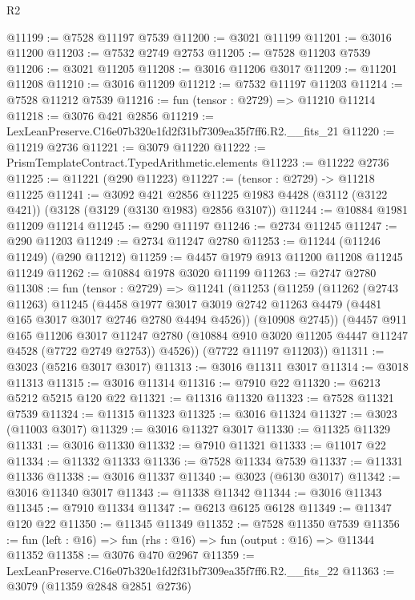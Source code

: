 \begin{lexlean}{R2}
\begin{coremodule}
@11199 := @7528 @11197 @7539
@11200 := @3021 @11199
@11201 := @3016 @11200
@11203 := @7532 @2749 @2753
@11205 := @7528 @11203 @7539
@11206 := @3021 @11205
@11208 := @3016 @11206 @3017
@11209 := @11201 @11208
@11210 := @3016 @11209
@11212 := @7532 @11197 @11203
@11214 := @7528 @11212 @7539
@11216 := fun (tensor : @2729) => @11210 @11214
@11218 := @3076 @421 @2856
@11219 := LexLeanPreserve.C16e07b320e1fd2f31bf7309ea35f7ff6.R2.__fits_21
@11220 := @11219 @2736
@11221 := @3079 @11220
@11222 := PrismTemplateContract.TypedArithmetic.elements
@11223 := @11222 @2736
@11225 := @11221 (@290 @11223)
@11227 := (tensor : @2729) -> @11218 @11225
@11241 := @3092
    @421
    @2856
    @11225
    @1983
    @4428
    (@3112 (@3122 @421))
    (@3128 (@3129 (@3130 @1983) @2856 @3107))
@11244 := @10884 @1981 @11209 @11214
@11245 := @290 @11197
@11246 := @2734 @11245
@11247 := @290 @11203
@11249 := @2734 @11247 @2780
@11253 := @11244 (@11246 @11249) (@290 @11212)
@11259 := @4457 @1979 @913 @11200 @11208 @11245 @11249
@11262 := @10884 @1978 @3020 @11199
@11263 := @2747 @2780
@11308 := fun (tensor : @2729) =>
  @11241
    (@11253
      (@11259
        (@11262
          (@2743 @11263)
          @11245
          (@4458
            @1977
            @3017
            @3019
            @2742
            @11263
            @4479
            (@4481 @165 @3017 @3017 @2746 @2780 @4494 @4526))
          (@10908 @2745))
        (@4457
          @911
          @165
          @11206
          @3017
          @11247
          @2780
          (@10884 @910 @3020 @11205 @4447 @11247 @4528 (@7722 @2749 @2753))
          @4526))
      (@7722 @11197 @11203))
@11311 := @3023 (@5216 @3017 @3017)
@11313 := @3016 @11311 @3017
@11314 := @3018 @11313
@11315 := @3016 @11314
@11316 := @7910 @22
@11320 := @6213 @5212 @5215 @120 @22
@11321 := @11316 @11320
@11323 := @7528 @11321 @7539
@11324 := @11315 @11323
@11325 := @3016 @11324
@11327 := @3023 (@11003 @3017)
@11329 := @3016 @11327 @3017
@11330 := @11325 @11329
@11331 := @3016 @11330
@11332 := @7910 @11321
@11333 := @11017 @22
@11334 := @11332 @11333
@11336 := @7528 @11334 @7539
@11337 := @11331 @11336
@11338 := @3016 @11337
@11340 := @3023 (@6130 @3017)
@11342 := @3016 @11340 @3017
@11343 := @11338 @11342
@11344 := @3016 @11343
@11345 := @7910 @11334
@11347 := @6213 @6125 @6128
@11349 := @11347 @120 @22
@11350 := @11345 @11349
@11352 := @7528 @11350 @7539
@11356 := fun (left : @16) => fun (rhs : @16) => fun (output : @16) => @11344 @11352
@11358 := @3076 @470 @2967
@11359 := LexLeanPreserve.C16e07b320e1fd2f31bf7309ea35f7ff6.R2.__fits_22
@11363 := @3079 (@11359 @2848 @2851 @2736)

\end{coremodule}
\end{lexlean}
